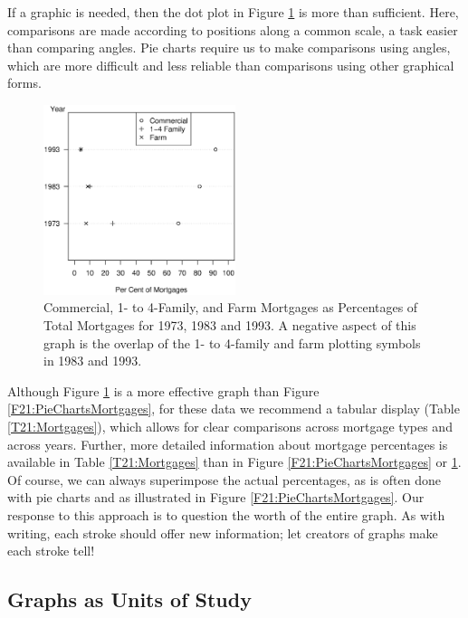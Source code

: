 If a graphic is needed, then the dot plot in Figure
\ref{F21:DotPlotPerCentMortgages} is more than sufficient. Here,
comparisons are made according to positions along a common scale, a
task easier than comparing angles. Pie charts require us to make
comparisons using angles, which are more difficult and less reliable
than comparisons using other graphical forms.

\begin{figure}[htp]
  \begin{center}
    \includegraphics[width=0.5\textwidth]
        {Chapter21Graphs/Fig21_13DotPlotPerCentMortgages.eps}
    \caption{\label{F21:DotPlotPerCentMortgages} \small Commercial, 1- to 4-Family, and Farm Mortgages as
Percentages of Total Mortgages for 1973, 1983 and 1993. A negative
aspect of this graph is the overlap of the 1- to 4-family and farm
plotting symbols in 1983 and 1993.}
  \end{center}
\end{figure}

Although Figure \ref{F21:DotPlotPerCentMortgages} is a more
effective graph than Figure \ref{F21:PieChartsMortgages}, for these
data we recommend a tabular display (Table \ref{T21:Mortgages}),
which allows for clear comparisons across mortgage types and across
years. Further, more detailed information about mortgage percentages
is available in Table \ref{T21:Mortgages} than in Figure
\ref{F21:PieChartsMortgages} or \ref{F21:DotPlotPerCentMortgages}.
Of course, we can always superimpose the actual percentages, as is
often done with pie charts and as illustrated in Figure
\ref{F21:PieChartsMortgages}. Our response to this approach is to
question the worth of the entire graph. As with writing, each stroke
should offer new information; let creators of graphs make each
stroke tell!

\linejed

\subsection{Graphs as Units of Study}

